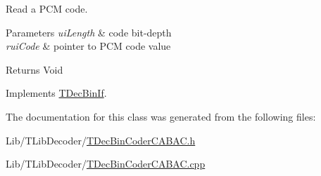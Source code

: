 Read a P\+CM code. 
\begin{DoxyParams}{Parameters}
{\em ui\+Length} & code bit-\/depth \\
\hline
{\em rui\+Code} & pointer to P\+CM code value \\
\hline
\end{DoxyParams}
\begin{DoxyReturn}{Returns}
Void 
\end{DoxyReturn}


Implements \hyperlink{class_t_dec_bin_if}{T\+Dec\+Bin\+If}.



The documentation for this class was generated from the following files\+:\begin{DoxyCompactItemize}
\item 
Lib/\+T\+Lib\+Decoder/\hyperlink{_t_dec_bin_coder_c_a_b_a_c_8h}{T\+Dec\+Bin\+Coder\+C\+A\+B\+A\+C.\+h}\item 
Lib/\+T\+Lib\+Decoder/\hyperlink{_t_dec_bin_coder_c_a_b_a_c_8cpp}{T\+Dec\+Bin\+Coder\+C\+A\+B\+A\+C.\+cpp}\end{DoxyCompactItemize}
